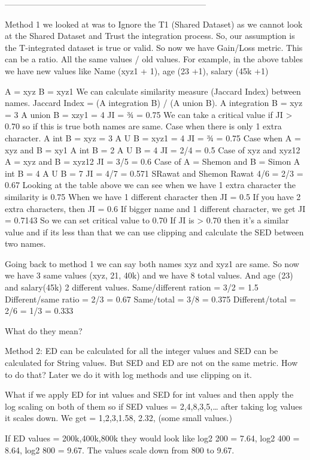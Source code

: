 \documentclass{article}
\begin{document}
------------------------------------------------------------------------

Method 1 we looked at was to Ignore the T1 (Shared Dataset) as we cannot look at the Shared Dataset and Trust the integration process. So, our assumption is the T-integrated dataset is true or valid. 
So now we have Gain/Loss metric. This can be a ratio. All the same values / old values. For example, in the above tables we have new values like Name (xyz1 + 1), age (23 +1), salary (45k +1)

A = xyz
B = xyz1
We can calculate similarity measure (Jaccard Index) between names. Jaccard Index =
(A integration B) / (A union B). 
A integration B = xyz = 3
A union B = xzy1 = 4
JI = ¾ = 0.75
We can take a critical value if JI > 0.70 so if this is true both names are same. 
Case when there is only 1 extra character.
A int B = xyz = 3
A U B = xyz1 = 4
JI = ¾  = 0.75	Case when A = xyz  and  B = xy1
A int B = 2
A U B = 4
JI = 2/4 = 0.5
Case of xyz and xyz12
A = xyz and B = xyz12
JI = 3/5 = 0.6 	Case of A = Shemon and B = Simon
A int B = 4
A U B = 7
JI = 4/7 = 0.571
SRawat and Shemon Rawat
	4/6 = 2/3 = 0.67
Looking at the table above we can see when we have 1 extra character the similarity is 0.75
When we have 1 different character then JI = 0.5
If you have 2 extra characters, then JI = 0.6 
If bigger name and 1 different character, we get JI = 0.7143
So we can set critical value to 0.70
If JI is > 0.70 then it’s a similar value and if its less than that we can use clipping and calculate the SED between two names.

Going back to method 1 we can say both names xyz and xyz1 are same. So now we have 3 same values (xyz, 21, 40k) and we have 8 total values. And age (23) and salary(45k) 2 different values.
Same/different ration = 3/2 = 1.5
Different/same ratio = 2/3 = 0.67
Same/total = 3/8 = 0.375
Different/total = 2/6 = 1/3 = 0.333

What do they mean?

Method 2: ED can be calculated for all the integer values and SED can be calculated for String values. But SED and ED are not on the same metric. How to do that? Later we do it with log methods and use clipping on it. 

What if we apply ED for int values and SED for int values and then apply the log scaling on both of them so if SED values = 2,4,8,3,5,… after taking log values it scales down. We get = 1,2,3,1.58, 2.32, (some small values.)

If ED values = 200k,400k,800k they would look like log2 200 = 7.64, log2 400 = 8.64, log2 800 = 9.67. The values scale down from 800 to 9.67.
\end{document}
